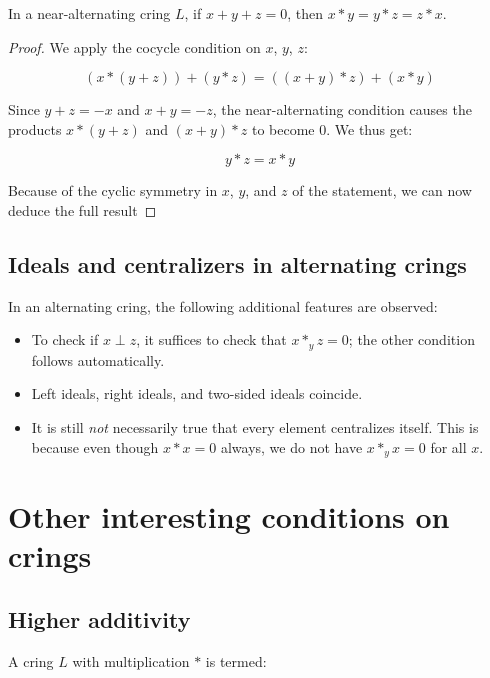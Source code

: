 \documentclass[10pt]{amsart}
\begin{document}
\begin{lemma}\label{lemma:shear}
  In a near-alternating cring $L$, if $x + y + z = 0$, then $x * y = y
  * z = z * x$.
\end{lemma}

\begin{proof}
  We apply the cocycle condition on $x$, $y$, $z$:

  $$(x * (y + z)) + (y * z) = ((x + y) * z) + (x * y)$$

  Since $y + z = -x$ and $x + y = -z$, the near-alternating condition
  causes the products $x * (y + z)$ and $(x + y) * z$ to become
  $0$. We thus get:

  $$y * z = x * y$$

  Because of the cyclic symmetry in $x$, $y$, and $z$ of the
  statement, we can now deduce the full result
\end{proof}


\subsection{Ideals and centralizers in alternating crings}

In an alternating cring, the following additional features are observed:

\begin{itemize}
\item To check if $x \perp z$, it suffices to check that $x *_y z =
  0$; the other condition follows automatically.
\item Left ideals, right ideals, and two-sided ideals coincide.
\item It is still {\em not} necessarily true that every element
  centralizes itself. This is because even though $x * x = 0$ always,
  we do not have $x *_y x = 0$ for all $x$.
\end{itemize}

\section{Other interesting conditions on crings}

\subsection{Higher additivity}

A cring $L$ with multiplication $*$ is termed:
\end{document}

